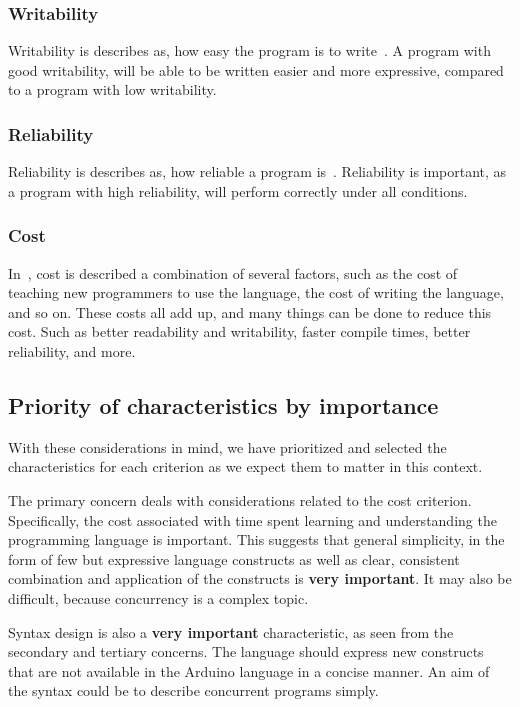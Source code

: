 \subsubsection{Writability}
Writability is describes as, how easy the program is to write~\cite{Sebesta2016}. A program with good writability, will be able to be written easier and more expressive, compared to a program with low writability.

\subsubsection{Reliability}
Reliability is describes as, how reliable a program is~\cite{Sebesta2016}. Reliability is important, as a program with high reliability, will perform correctly under all conditions.

\subsubsection{Cost}
In~, cost is described a combination of several factors, such as the cost of teaching new programmers to use the language, the cost of writing the language, and so on. These costs all add up, and many things can be done to reduce this cost. Such as better readability and writability, faster compile times, better reliability, and more.

\subsection{Priority of characteristics by importance}
With these considerations in mind, we have prioritized and selected the characteristics for each criterion as we expect them to matter in this context.

The primary concern deals with considerations related to the cost criterion. Specifically, the cost associated with time spent learning and understanding the programming language is important. This suggests that general simplicity, in the form of few but expressive language constructs as well as clear, consistent combination and application of the constructs is \textbf{very important}. It may also be difficult, because concurrency is a complex topic.

Syntax design is also a \textbf{very important} characteristic, as seen from the secondary and tertiary concerns. The language should express new constructs that are not available in the Arduino language in a concise manner. An aim of the syntax could be to describe concurrent programs simply. 

